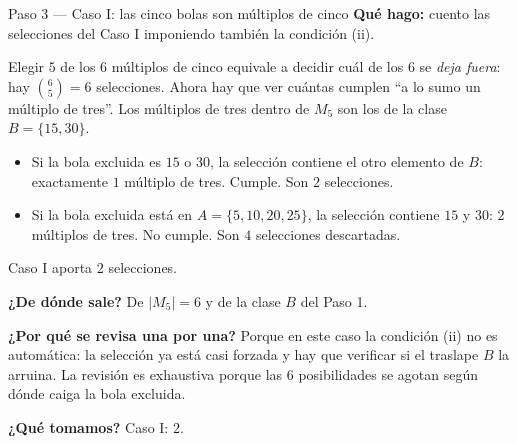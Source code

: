 \documentclass[11pt]{article}
\begin{document}
\begin{paso}{Paso 3 --- Caso I: las cinco bolas son múltiplos de cinco}
\textbf{Qué hago:} cuento las selecciones del Caso I imponiendo también la condición (ii).

Elegir $5$ de los $6$ múltiplos de cinco equivale a decidir cuál de los $6$ se \emph{deja fuera}: hay $\binom{6}{5}=6$ selecciones. Ahora hay que ver cuántas cumplen ``a lo sumo un múltiplo de tres''. Los múltiplos de tres dentro de $M_5$ son los de la clase $B=\{15,30\}$.
\begin{itemize}[leftmargin=1.3em,itemsep=1pt]
\item Si la bola excluida es $15$ o $30$, la selección contiene el otro elemento de $B$: exactamente $1$ múltiplo de tres. Cumple. Son $2$ selecciones.
\item Si la bola excluida está en $A=\{5,10,20,25\}$, la selección contiene $15$ y $30$: $2$ múltiplos de tres. No cumple. Son $4$ selecciones descartadas.
\end{itemize}
Caso I aporta $2$ selecciones.

\textbf{¿De dónde sale?} De $|M_5|=6$ y de la clase $B$ del Paso 1.

\textbf{¿Por qué se revisa una por una?} Porque en este caso la condición (ii) no es automática: la selección ya está casi forzada y hay que verificar si el traslape $B$ la arruina. La revisión es exhaustiva porque las $6$ posibilidades se agotan según dónde caiga la bola excluida.

\textbf{¿Qué tomamos?} Caso I: $2$.
\end{paso}
\end{document}
